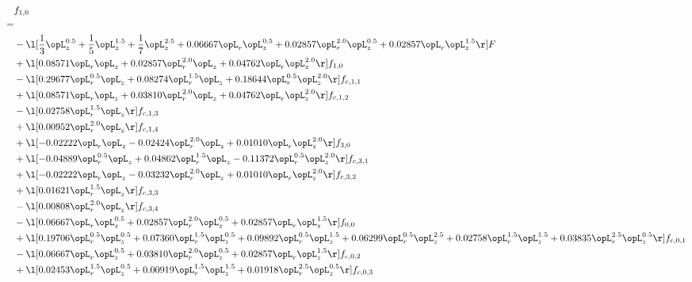 \begin{alignat}{2} 
\label{eq:f_10_1} 
& f_{1,0} \nonumber \\ 
 = \\ 
& - \l[ \frac{1}{3} \opL_z^{0.5} + \frac{1}{5} \opL_z^{1.5} + \frac{1}{7} \opL_z^{2.5} +  0.06667 \opL_r \opL_z^{0.5} +  0.02857 \opL_r^{2.0} \opL_z^{0.5} +  0.02857 \opL_r \opL_z^{1.5}  \r] F \nonumber \\ 
& + \l[  0.08571 \opL_r \opL_z +  0.02857 \opL_r^{2.0} \opL_z +  0.04762 \opL_r \opL_z^{2.0}  \r] f_{1,0} \nonumber \\ 
& - \l[  0.29677 \opL_r^{0.5} \opL_z +  0.08274 \opL_r^{1.5} \opL_z +  0.18644 \opL_r^{0.5} \opL_z^{2.0}  \r] f_{c,1,1} \nonumber \\ 
& + \l[  0.08571 \opL_r \opL_z +  0.03810 \opL_r^{2.0} \opL_z +  0.04762 \opL_r \opL_z^{2.0}  \r] f_{c,1,2} \nonumber \\ 
& - \l[  0.02758 \opL_r^{1.5} \opL_z  \r] f_{c,1,3} \nonumber \\ 
& + \l[  0.00952 \opL_r^{2.0} \opL_z  \r] f_{c,1,4} \nonumber \\ 
& + \l[  -0.02222 \opL_r \opL_z   -0.02424 \opL_r^{2.0} \opL_z +  0.01010 \opL_r \opL_z^{2.0}  \r] f_{3,0} \nonumber \\ 
& + \l[  -0.04889 \opL_r^{0.5} \opL_z +  0.04862 \opL_r^{1.5} \opL_z   -0.11372 \opL_r^{0.5} \opL_z^{2.0}  \r] f_{c,3,1} \nonumber \\ 
& + \l[  -0.02222 \opL_r \opL_z   -0.03232 \opL_r^{2.0} \opL_z +  0.01010 \opL_r \opL_z^{2.0}  \r] f_{c,3,2} \nonumber \\ 
& + \l[  0.01621 \opL_r^{1.5} \opL_z  \r] f_{c,3,3} \nonumber \\ 
& - \l[  0.00808 \opL_r^{2.0} \opL_z  \r] f_{c,3,4} \nonumber \\ 
& - \l[  0.06667 \opL_r \opL_z^{0.5} +  0.02857 \opL_r^{2.0} \opL_z^{0.5} +  0.02857 \opL_r \opL_z^{1.5}  \r] f_{0,0} \nonumber \\ 
& + \l[  0.19706 \opL_r^{0.5} \opL_z^{0.5} +  0.07360 \opL_r^{1.5} \opL_z^{0.5} +  0.09892 \opL_r^{0.5} \opL_z^{1.5} +  0.06299 \opL_r^{0.5} \opL_z^{2.5} +  0.02758 \opL_r^{1.5} \opL_z^{1.5} +  0.03835 \opL_r^{2.5} \opL_z^{0.5}  \r] f_{c,0,1} \nonumber \\ 
& - \l[  0.06667 \opL_r \opL_z^{0.5} +  0.03810 \opL_r^{2.0} \opL_z^{0.5} +  0.02857 \opL_r \opL_z^{1.5}  \r] f_{c,0,2} \nonumber \\ 
& + \l[  0.02453 \opL_r^{1.5} \opL_z^{0.5} +  0.00919 \opL_r^{1.5} \opL_z^{1.5} +  0.01918 \opL_r^{2.5} \opL_z^{0.5}  \r] f_{c,0,3} \nonumber \\ 

\end{alignat}
